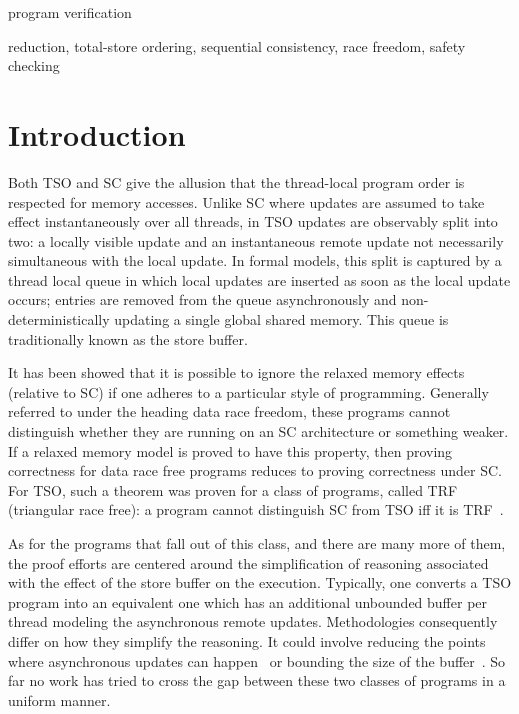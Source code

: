 \documentclass[preprint,9pt]{sigplanconf}
\begin{document}

\terms
program verification

\keywords
reduction, total-store ordering, sequential consistency, race freedom, safety checking 

\section{Introduction}
\label{sec:intro}
Both TSO and SC give the allusion that the thread-local program order is respected for memory accesses.
Unlike SC where updates are assumed to take effect instantaneously over all threads, in TSO updates are observably split into two: a locally visible update and an instantaneous remote update not necessarily simultaneous with the local update.
In formal models, this split is captured by a thread local queue in which local updates are inserted as soon as the local update occurs; entries are removed from the queue asynchronously and non-deterministically updating a single global shared memory. 
This queue is traditionally known as the store buffer.

It has been showed that it is possible to ignore the relaxed memory effects (relative to SC) if one adheres to a particular style of programming. 
Generally referred to under the heading data race freedom, these programs cannot distinguish whether they are running on an SC architecture or something weaker. 
If a relaxed memory model is proved to have this property, then proving correctness for data race free programs reduces to proving correctness under SC.
For TSO, such a theorem was proven for a class of programs, called TRF (triangular race free): a program cannot distinguish SC from TSO iff it is TRF~\cite{Owe2010}.

As for the programs that fall out of this class, and there are many more of them, the proof efforts are centered around the simplification of reasoning associated with the effect of the store buffer on the execution.
Typically, one converts a TSO program into an equivalent one which has an additional unbounded buffer per thread modeling the asynchronous remote updates. 
Methodologies consequently differ on how they simplify the reasoning. 
It could involve reducing the points where asynchronous updates can happen~\cite{AK20XX} or bounding the size of the buffer~\cite{BYZ20XX}.
So far no work has tried to cross the gap between these two classes of programs in a uniform manner.
\end{document}
